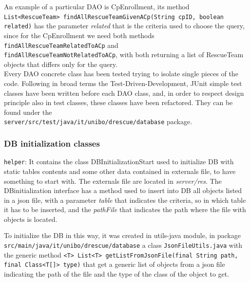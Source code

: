\documentclass[a4paper,12pt]{report}
\begin{document}
An example of a particular DAO is CpEnrollment, its method \\
\texttt{List<RescueTeam> findAllRescueTeamGivenACp(String cpID, boolean related)} has the parameter \textit{related} that is the criteria used to choose the query, since for the CpEnrollment we need both methods \texttt{findAllRescueTeamRelatedToACp} and \\
\texttt{findAllRescueTeamNotRelatedToACp}, with both returning a list of RescueTeam objects that differs only for the query. \\
Every DAO concrete class has been tested trying to isolate single pieces of the code. Following in broad terms the Test-Driven-Development, JUnit simple test classes have been written before each DAO class, and, in order to respect design principle also in test classes, these classes have been refactored. They can be found under the\\ \texttt{server/src/test/java/it/unibo/drescue/database} package.\\

\subsubsection{DB initialization classes}
\texttt{helper}: It contains the class DBInitializationStart used to initialize DB with static tables contents and some other data contained in externals file, to have something to start with.
The externals file are located in \textit{server/res}. The DBinitialization interface has a method used to insert into DB all objects listed in a json file, with a parameter \textit{table} that indicates the criteria, so in which table it has to be inserted, and the \textit{pathFile} that indicates the path where the file with objects is located.

To initialize the DB in this way, it was created in utils-java module, in package \texttt{src/main/java/it/unibo/drescue/database} a class \texttt{JsonFileUtils.java} with the generic method \texttt{<T> List<T> getListFromJsonFile(final String path, \\final Class<T[]> type)} that get a generic list of objects from a json file indicating the path of the file and the type of the class of the object to get.
\end{document}
